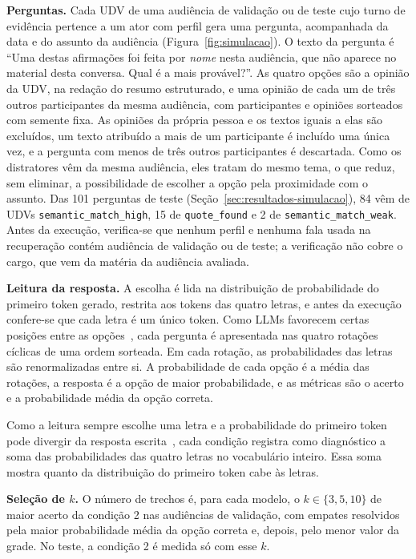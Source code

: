 \textbf{Perguntas.} Cada UDV de uma audiência de validação ou de teste cujo turno de evidência
pertence a um ator com perfil gera uma pergunta, acompanhada da data e do assunto da audiência
(Figura~\ref{fig:simulacao}). O texto da pergunta é ``Uma destas afirmações foi feita por
\textit{nome} nesta audiência, que não aparece no material desta conversa. Qual é a mais provável?''.
As quatro opções são a opinião da UDV, na redação do resumo estruturado, e uma opinião de cada um de
três outros participantes da mesma audiência, com participantes e opiniões sorteados com semente fixa.
As opiniões da própria pessoa e os textos iguais a elas são excluídos, um texto atribuído a mais de um
participante é incluído uma única vez, e a pergunta com menos de três outros participantes é
descartada. Como os distratores vêm da mesma audiência, eles tratam do mesmo tema, o que reduz, sem
eliminar, a possibilidade de escolher a opção pela proximidade com o assunto. Das 101 perguntas de
teste (Seção~\ref{sec:resultados-simulacao}), 84 vêm de UDVs \texttt{semantic\_match\_high}, 15 de
\texttt{quote\_found} e 2 de \texttt{semantic\_match\_weak}. Antes da execução, verifica-se que
nenhum perfil e nenhuma fala usada na recuperação contém audiência de validação ou de teste; a
verificação não cobre o cargo, que vem da matéria da audiência avaliada.

\textbf{Leitura da resposta.} A escolha é lida na distribuição de probabilidade do primeiro token
gerado, restrita aos tokens das quatro letras, e antes da execução confere-se que cada letra é um
único token. Como LLMs favorecem certas posições entre as
opções~\citep{zheng2024large,pezeshkpour2024large}, cada pergunta é apresentada nas quatro rotações
cíclicas de uma ordem sorteada. Em cada rotação, as probabilidades das letras são renormalizadas
entre si. A probabilidade de cada opção é a
média das rotações, a resposta é a opção de maior probabilidade, e as métricas são o acerto e a
probabilidade média da opção correta.

Como a leitura sempre escolhe uma letra e a probabilidade do primeiro token pode divergir da
resposta escrita~\citep{wang2024answer}, cada condição registra como diagnóstico a soma das
probabilidades das quatro letras no vocabulário inteiro. Essa soma mostra quanto da distribuição do
primeiro token cabe às letras.

\textbf{Seleção de $k$.} O número de trechos é, para cada modelo, o $k \in \{3, 5, 10\}$ de maior
acerto da condição 2 nas audiências de validação, com empates resolvidos pela maior probabilidade média da opção correta
e, depois, pelo menor valor da grade. No teste, a condição 2 é medida só com esse $k$.

